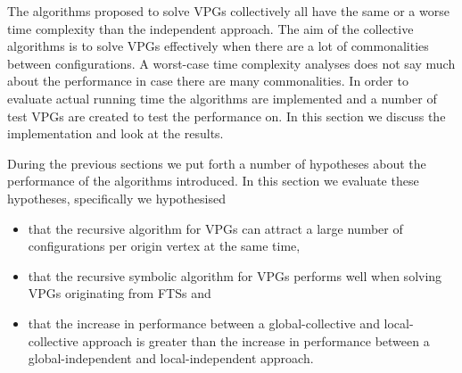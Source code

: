 The algorithms proposed to solve VPGs collectively all have the same or a worse time complexity than the independent approach. The aim of the collective algorithms is to solve VPGs effectively when there are a lot of commonalities between configurations. A worst-case time complexity analyses does not say much about the performance in case there are many commonalities. In order to evaluate actual running time the algorithms are implemented and a number of test VPGs are created to test the performance on. In this section we discuss the implementation and look at the results.

During the previous sections we put forth a number of hypotheses about the performance of the algorithms introduced. In this section we evaluate these hypotheses, specifically we hypothesised
\begin{itemize}
	\item that the recursive algorithm for VPGs can attract a large number of configurations per origin vertex at the same time,
	\item that the recursive symbolic algorithm for VPGs performs well when solving VPGs originating from FTSs and
	\item that the increase in performance between a global-collective and local-collective approach is greater than the increase in performance between a global-independent and local-independent approach.
\end{itemize}